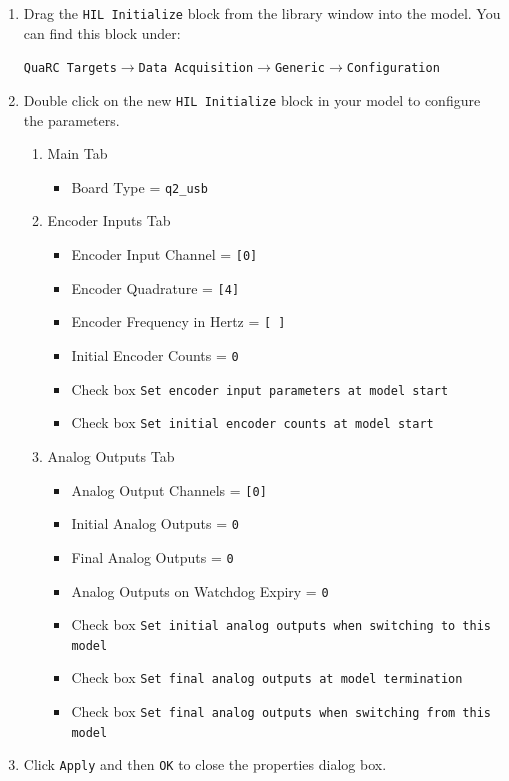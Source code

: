 \begin{enumerate}
\item Drag the \verb|HIL Initialize| block from the library window into the
model.  You can find this block under:
\begin{center}
\verb|QuaRC Targets|$\to$\verb|Data Acquisition|$\to$\verb|Generic|$\to$\verb|Configuration|
\end{center}
\item Double click on the new \verb|HIL Initialize| block in your model to
configure the parameters.
\begin{enumerate}
\item Main Tab
\begin{itemize}
\item Board Type = \verb|q2_usb|
\end{itemize}
\item Encoder Inputs Tab
\begin{itemize}
\item Encoder Input Channel = \verb|[0]|
\item Encoder Quadrature = \verb|[4]|
\item Encoder Frequency in Hertz = \verb|[ ]|
\item Initial Encoder Counts = \verb|0|
\item Check box \verb|Set encoder input parameters at model start|
\item Check box \verb|Set initial encoder counts at model start|
\end{itemize}
\item Analog Outputs Tab
\begin{itemize}
\item Analog Output Channels = \verb|[0]|
\item Initial Analog Outputs = \verb|0|
\item Final Analog Outputs = \verb|0|
\item Analog Outputs on Watchdog Expiry = \verb|0|
\item Check box \verb|Set initial analog outputs when switching to this model|
\item Check box \verb|Set final analog outputs at model termination|
\item Check box \verb|Set final analog outputs when switching from this model|
\end{itemize}
\end{enumerate}

\item Click \verb|Apply| and then \verb|OK| to close the properties dialog box.


\end{enumerate}
